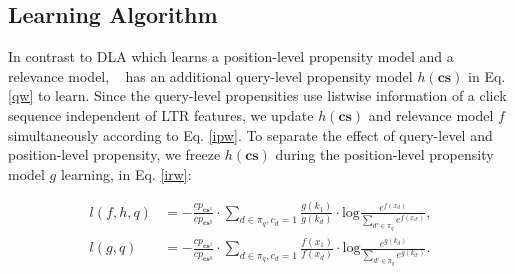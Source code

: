 \subsection{Learning Algorithm}
In contrast to DLA which learns a position-level propensity model and a relevance model, \m~ has an additional query-level propensity model $h(\mathbf{cs})$ in Eq. \ref{qw} to learn. Since the query-level propensities use listwise information of a click sequence independent of LTR features, we update $h(\mathbf{cs})$ and relevance model $f$ simultaneously according to Eq. \ref{ipw}. To separate the effect of query-level and position-level propensity, we freeze $h(\mathbf{cs})$ during the position-level propensity model $g$ learning, in Eq. \ref{irw}:
\begin{small}
\begin{align}
    l(f,h,q)&=-\frac{cp_{\mathbf{cs}^1}}{cp_{\mathbf{cs}^q}}\cdot\sum_{d\in \pi_q,c_d=1}\frac{g(k_1)}{g(k_d)}\cdot \textrm{log}\frac{e^{f(x_d)}}{\sum_{d'\in \pi_q} e^{f(x_{d'})}}\text{,}\label{ipw} \\
    l(g,q)&=-\frac{cp_{\mathbf{cs}^1}}{cp_{\mathbf{cs}^q}}\cdot\sum_{d\in \pi_q,c_d=1}\frac{f(x_1)}{f(x_d)}\cdot \textrm{log}\frac{e^{g(k_d)}}{\sum_{d'\in \pi_q} e^{g(k_{d'})}}\text{.} \label{irw}
\end{align}
\end{small}


